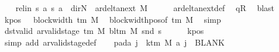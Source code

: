 \begin{isabellebody}
\ \ \isamarkupfalse%
\ rel{\isacharunderscore}{\kern0pt}in{\isacharcolon}{\kern0pt}\ {\isachardoublequoteopen}{\isacharparenleft}{\kern0pt}{\isacharquery}{\kern0pt}s{\isacharcomma}{\kern0pt}\ {\isacharquery}{\kern0pt}a{\isacharcomma}{\kern0pt}\ {\isacharquery}{\kern0pt}s{\isacharprime}{\kern0pt}{\isacharcomma}{\kern0pt}\ {\isacharquery}{\kern0pt}a{\isacharcomma}{\kern0pt}\ {\isacharparenleft}{\kern0pt}{\isasymlambda}{\isacharunderscore}{\kern0pt}{\isachardot}{\kern0pt}\ dir{\isachardot}{\kern0pt}N{\isacharparenright}{\kern0pt}{\isacharparenright}{\kern0pt}\ {\isasymin}\ ar{\isacharunderscore}{\kern0pt}delta{\isacharunderscore}{\kern0pt}next\ M{\isachardoublequoteclose}\isanewline
\ \ \ \ \isamarkupfalse%
\ ar{\isacharunderscore}{\kern0pt}delta{\isacharunderscore}{\kern0pt}next{\isacharunderscore}{\kern0pt}def\ \isamarkupfalse%
\ qR\ \isamarkupfalse%
\ blast\isanewline
\ \ \isamarkupfalse%
\ kpos{\isacharcolon}{\kern0pt}\ {\isachardoublequoteopen}{}\ {\isacharless}{\kern0pt}\ block{\isacharunderscore}{\kern0pt}width\ {\isacharparenleft}{\kern0pt}{\isasymGamma}{\isacharunderscore}{\kern0pt}tm\ M{\isacharparenright}{\kern0pt}{\isachardoublequoteclose}\ \isamarkupfalse%
\ block{\isacharunderscore}{\kern0pt}width{\isacharunderscore}{\kern0pt}pos{\isacharbrackleft}{\kern0pt}of\ {\isachardoublequoteopen}{\isasymGamma}{\isacharunderscore}{\kern0pt}tm\ M{\isachardoublequoteclose}{\isacharbrackright}{\kern0pt}\ \isamarkupfalse%
\ simp\isanewline
\ \ \isamarkupfalse%
\ dst{\isacharunderscore}{\kern0pt}valid{\isacharcolon}{\kern0pt}\ {\isachardoublequoteopen}ar{\isacharunderscore}{\kern0pt}valid{\isacharunderscore}{\kern0pt}stage\ {\isacharparenleft}{\kern0pt}{\isasymGamma}{\isacharunderscore}{\kern0pt}tm\ M{\isacharparenright}{\kern0pt}\ {\isacharparenleft}{\kern0pt}bl{\isacharunderscore}{\kern0pt}tm\ M{\isacharparenright}{\kern0pt}\ {\isacharparenleft}{\kern0pt}snd\ {\isacharquery}{\kern0pt}s{\isacharprime}{\kern0pt}{\isacharparenright}{\kern0pt}{\isachardoublequoteclose}\isanewline
\ \ \ \ \isamarkupfalse%
\ kpos\ \isamarkupfalse%
\ {\isacharparenleft}{\kern0pt}simp\ add{\isacharcolon}{\kern0pt}\ ar{\isacharunderscore}{\kern0pt}valid{\isacharunderscore}{\kern0pt}stage{\isacharunderscore}{\kern0pt}def{\isacharparenright}{\kern0pt}\isanewline
\ \ \isamarkupfalse%
\ pad{\isacharunderscore}{\kern0pt}a{\isacharcolon}{\kern0pt}\ {\isachardoublequoteopen}{\isasymforall}j\ {\isasymge}\ k{\isacharunderscore}{\kern0pt}tm\ M{\isachardot}{\kern0pt}\ {\isacharquery}{\kern0pt}a\ j\ {\isacharequal}{\kern0pt}\ BLANK{}{\isachardoublequoteclose}\ \isamarkupfalse%

\end{isabellebody}
